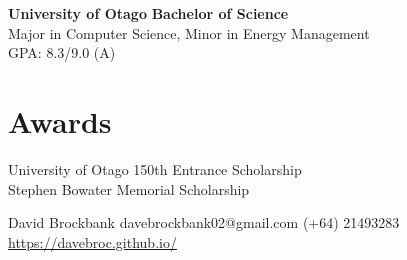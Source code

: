 \documentclass[lighthipster]{simplehipstercv}
\newlength{\rightcolwidth}
\begin{document}
\begin{paracol}{2}
\begin{minipage}[t]{0.7\textwidth}
    \textbf{University of Otago}
    \textbf{Bachelor of Science}\\
    Major in Computer Science, Minor in Energy Management\\
    GPA: 8.3/9.0 (A)\\
    
    \end{minipage}
      
    \bigskip
    
    \begin{minipage}[t]{0.7\textwidth}
    \section*{Awards}
    University of Otago 150th Entrance Scholarship\\
    Stephen Bowater Memorial Scholarship
    \bigskip
    
  
    
    \end{minipage}\hfill
    \bigskip
    \bigskip
    \bigskip
    \bigskip
    \bigskip
    \bigskip
    \bigskip
    \bigskip
    \bigskip
    \bigskip
    \bigskip
    \bigskip
    \bigskip
    \bigskip
    \bigskip
    \bigskip
    \bigskip
    \bigskip
    \bigskip
    \bigskip
    \bigskip
    \bigskip
    \bigskip
    \bigskip
    \bigskip
    \bigskip
    \bigskip
\setlength{\parindent}{0pt}
\begin{minipage}[t]{\rightcolwidth}
\begin{center}\fontfamily{\sfdefault}\selectfont \color{black!70}
{\small David Brockbank davebrockbank02@gmail.com   (+64) 21493283 \newline{} \protect\url{https://davebroc.github.io/}
}
\end{center}
\end{minipage}


    
    \end{paracol}
    
    
\end{document}
